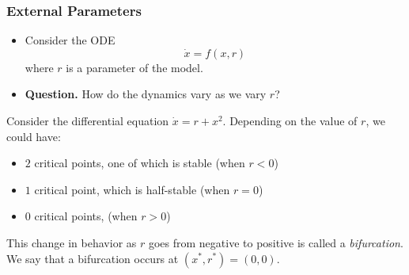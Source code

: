 \documentclass[class=article, crop=false]{standalone}
\begin{document}
  \subsubsection{External Parameters}
  \begin{itemize}
    \item Consider the ODE
    \[
      \dot{x} = f(x, r)
    \]
    where $r$ is a parameter of the model.
    \item \textbf{Question.} How do the dynamics vary as we vary $r$?
  \end{itemize}
  \begin{example}{}
    Consider the differential equation $\dot{x} = r + x^2$. Depending on the value of $r$, we could have:
    \begin{itemize}
      \item $2$ critical points, one of which is stable (when $r < 0$)
      \item $1$ critical point, which is half-stable (when $r = 0$)
      \item $0$ critical points, (when $r > 0$)
    \end{itemize}
    This change in behavior as $r$ goes from negative to positive is called a \emph{bifurcation}. We say that a bifurcation occurs at $(x^*, r^*) = (0, 0)$.
  \end{example}
\end{document}
